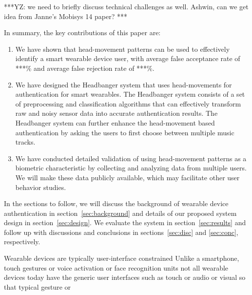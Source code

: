 ***YZ: we need to briefly discuss technical challenges as well. Ashwin, can we get idea from Janne's Mobisys 14 paper? ***

In summary, the key contributions of this paper are:
\begin{enumerate}
\item We have shown that head-movement patterns can be used to effectively identify a smart wearable device user, with average false acceptance rate of ***\% and average false rejection rate of ***\%. 

\item We have designed the Headbanger system that uses head-movements for authentication for smart wearables. The Headbanger system consists of a set of preprocessing and classification algorithms that can effectively transform raw and noisy sensor data into accurate authentication results. The Headbanger system can further enhance the head-movement based authentication by asking the users to first choose between multiple music tracks.


\item We have conducted detailed validation of using head-movement patterns as a biometric characteristic by collecting and analyzing data from multiple users. We will make these data publicly available, which may facilitate other user behavior studies. 
\end{enumerate}

In the sections to follow, we will discuss the background of wearable
device authentication in section~\ref{sec:background} and details of our 
proposed system design in section~\ref{sec:design}. We evaluate the system in 
section~\ref{sec:results} and follow up with discussions and conclusions in 
sections~\ref{sec:disc} and \ref{sec:conc}, respectively.










\iffalse
Wearable devices are typically user-interface constrained
Unlike a smartphone, touch gestures or voice activation or face
recognition units not all wearable devices today have the generic
user interfaces such as touch or audio or visual so that typical
gesture or

